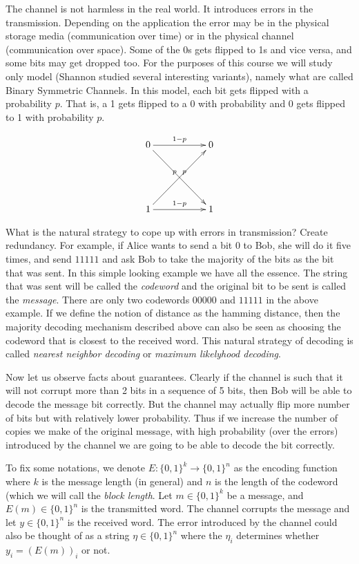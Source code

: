 The channel is not harmless in the real world. It introduces errors in
the transmission. Depending on the application the error may be in the
physical storage media (communication over time) or in the physical
channel (communication over space). Some of the 0s gets flipped to 1s
and vice versa, and some bits may get dropped too. For the purposes of
this course we will study only model (Shannon studied several
interesting variants), namely what are called Binary Symmetric
Channels. In this model, each bit gets flipped with a probability $p$.
That is, a 1 gets flipped to a 0 with probability and 0 gets flipped
to 1 with probability $p$.

\[\xymatrix{ 0\ar[rr]^{1-p}\ar[rrdd]^{p} &&0\\
&&\\
1\ar[rr]^{1-p}\ar[rruu]^{p} && 1
}\]
           

What is the natural strategy to cope up with errors in transmission?
Create redundancy. For example, if Alice wants to send a bit 0 to Bob,
she will do it five times, and send $11111$ and ask Bob to take the
majority of the bits as the bit that was sent. In this simple looking
example we have all the essence. The string that was sent will be
called the {\em codeword} and the original bit to be sent is called
the {\em message}. There are only two codewords $00000$ and $11111$ in
the above example. If we define the notion of distance as the hamming
distance, then the majority decoding mechanism described above can
also be seen as choosing the codeword that is closest to the received
word. This natural strategy of decoding is called {\em nearest
  neighbor decoding} or {\em maximum likelyhood decoding}.

Now let us observe facts about guarantees. Clearly if the channel is
such that it will not corrupt more than 2 bits in a sequence of 5
bits, then Bob will be able to decode the message bit correctly. But
the channel may actually flip more number of bits but with relatively
lower probability. Thus if we increase the number of copies we make of
the original message, with high probability (over the errors)
introduced by the channel we are going to be able to decode the bit
correctly.

To fix some notations, we denote $E: \{0,1\}^k \to \{0,1\}^n$ as the
encoding function where $k$ is the message length (in general) and $n$
is the length of the codeword (which we will call the {\em block
  length}. Let $m \in \{0,1\}^k$ be a message, and $E(m) \in
\{0,1\}^n$ is the transmitted word. The channel corrupts the message
and let $y \in \{0,1\}^n$ is the received word. The error introduced
by the channel could also be thought of as a string $\eta \in
\{0,1\}^n$ where the $\eta_i$ determines whether $y_i = (E(m))_i$ or
not.

